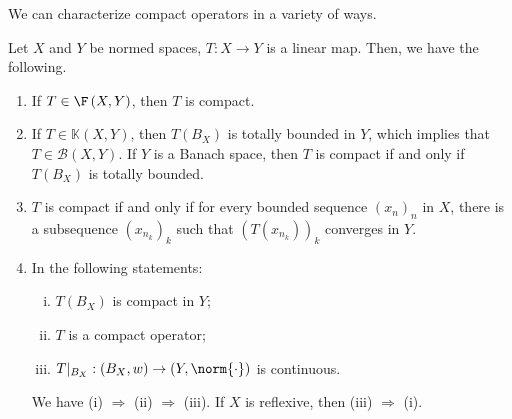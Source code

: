 \documentclass[10pt]{mypackage}
\begin{document}
We can characterize compact operators in a variety of ways.
\begin{proposition}
  Let $X$ and $Y$ be normed spaces, $T: X\rightarrow Y$ is a linear map. Then, we have the following.
  \begin{enumerate}[(1)]
    \item If $T\in \F\left(X,Y\right)$, then $T$ is compact.
    \item If $T\in \mathds{K}\left(X,Y\right)$, then $T\left(B_X\right)$ is totally bounded in $Y$, which implies that $T\in \mathcal{B}\left(X,Y\right)$. If $Y$ is a Banach space, then $T$ is compact if and only if $T\left(B_X\right)$ is totally bounded.
    \item $T$ is compact if and only if for every bounded sequence $\left(x_n\right)_n$ in $X$, there is a subsequence $\left(x_{n_k}\right)_{k}$ such that $\left(T\left(x_{n_k}\right)\right)_{k}$ converges in $Y$.
    \item In the following statements:
      \begin{enumerate}[(i)]
        \item $T\left(B_X\right)$ is compact in $Y$;
        \item $T$ is a compact operator;
        \item $T|_{B_X}: \left(B_{X},w\right)\rightarrow \left(Y,\norm{\cdot}\right)$ is continuous.
      \end{enumerate}
      We have (i) $\Rightarrow$ (ii) $\Rightarrow$ (iii). If $X$ is reflexive, then (iii) $\Rightarrow$ (i).
  \end{enumerate}
\end{proposition}
\end{document}
